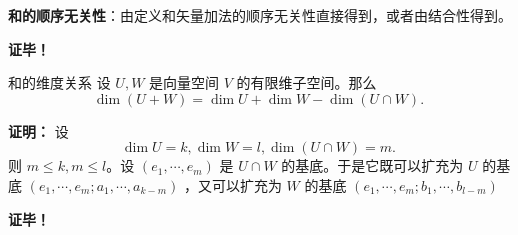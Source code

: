 \textbf{和的顺序无关性}：由定义和矢量加法的顺序无关性直接得到，或者由结合性得到。

\textbf{证毕！}

\begin{lemma}{}

\end{lemma}


\begin{theorem}{和的维度关系}
设 $U,W$ 是向量空间 $V$ 的有限维子空间。那么
\begin{equation}
\dim (U+W)=\dim U+\dim W-\dim(U\cap W).~
\end{equation}

\end{theorem}

\textbf{证明：}
设
\begin{equation}
\dim U=k,\dim W=l,\dim(U\cap W)=m.~
\end{equation}
则 $m\leq k,m\leq l$。设 $(e_1,\cdots,e_m)$ 是 $U\cap W$ 的基底。于是它既可以扩充为 $U$ 的基底 $(e_1,\cdots,e_m;a_1,\cdots,a_{k-m})$ ，又可以扩充为 $W$ 的基底 $(e_1,\cdots,e_m;b_1,\cdots,b_{l-m})$


\textbf{证毕！}



